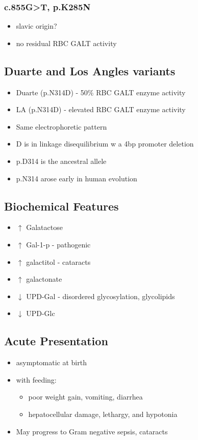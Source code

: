 \documentclass{scrartcl}
\begin{document}
\subsubsection{c.855G>T, p.K285N}
\label{sec:org3ebbdb3}
\begin{itemize}
\item slavic origin?
\item no residual RBC GALT activity
\end{itemize}

\subsection{Duarte and Los Angles variants}
\label{sec:orgaad5f54}
\begin{itemize}
\item Duarte (p.N314D) - 50\% RBC GALT enzyme activity
\item LA (p.N314D) - elevated RBC GALT enzyme activity
\item Same electrophoretic pattern
\item D is in linkage disequilibrium w a 4bp promoter deletion
\item p.D314 is the ancestral allele
\item p.N314 arose early in human evolution
\end{itemize}


\subsection{Biochemical Features}
\label{sec:org6fc5594}
\begin{itemize}
\item \(\uparrow\)  Galatactose
\item \(\uparrow\) Gal-1-p - pathogenic
\item \(\uparrow\)  galactitol - cataracts
\item \(\uparrow\) galactonate
\item \(\downarrow\) UPD-Gal - disordered glycosylation, glycolipids
\item \(\downarrow\) UPD-Glc
\end{itemize}

\subsection{Acute Presentation}
\label{sec:orgc3043c4}
\begin{itemize}
\item asymptomatic at birth
\item with feeding:
\begin{itemize}
\item poor weight gain, vomiting, diarrhea
\item hepatocellular damage, lethargy, and hypotonia
\end{itemize}
\item May progress to Gram negative sepsis, cataracts
\end{itemize}
\end{document}
